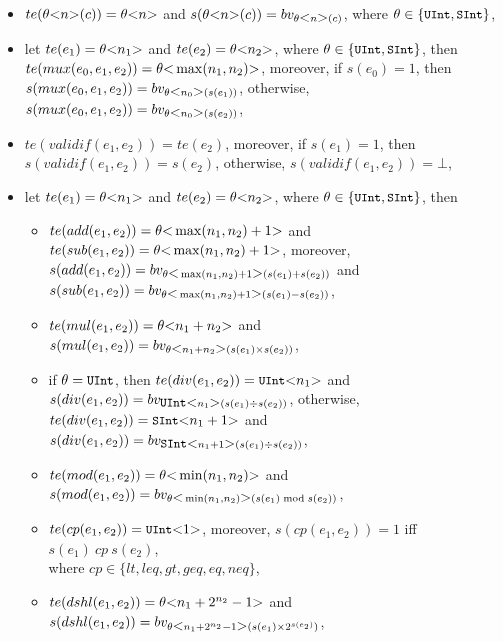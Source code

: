\begin{itemize}
\item $te(\theta \mbox{<} n \mbox{>}(c)) = \theta \mbox{<} n \mbox{>}$ and $s(\theta \mbox{<} n \mbox{>}(c)) = bv_{\theta \mbox{<} n \mbox{>}(c)}$, where $\theta \in \{\mbox{\prettyll{UInt}}, \mbox{\prettyll{SInt}}\}$,
%
\item let $te(e_1) = \theta \mbox{<} n_1 \mbox{>}$ and $te(e_2) = \theta \mbox{<} n_2 \mbox{>}$, where $\theta \in \{\mbox{\prettyll{UInt}}, \mbox{\prettyll{SInt}}\}$, then $te(mux(e_0, e_1, e_2)) = \theta\mbox{<} \max(n_1, n_2) \mbox{>}$, moreover, if $s(e_0) = 1$, then $s(mux(e_0, e_1, e_2)) = bv_{\theta\mbox{<} n_0 \mbox{>}(s(e_1))}$, otherwise, $s(mux(e_0, e_1, e_2)) = bv_{\theta\mbox{<} n_0 \mbox{>}(s(e_2))}$,
%
\item $te(validif(e_1, e_2)) = te(e_2)$, moreover, if $s(e_1) = 1$, then $s(validif(e_1, e_2)) = s(e_2)$, otherwise, $s(validif(e_1, e_2))  = \bot$,
%
\item let $te(e_1) = \theta \mbox{<} n_1 \mbox{>}$ and $te(e_2) = \theta \mbox{<} n_2 \mbox{>}$, where $\theta \in \{\mbox{\prettyll{UInt}}, \mbox{\prettyll{SInt}}\}$, then
\begin{itemize}
\item $te(add(e_1, e_2)) =\theta \mbox{<} \max(n_1, n_2)+1 \mbox{>}$ and $te(sub(e_1, e_2)) = \theta \mbox{<} \max(n_1, n_2)+1 \mbox{>}$, moreover, $s(add(e_1, e_2)) = bv_{\theta \mbox{<} \max(n_1,n_2)+1 \mbox{>} (s(e_1) + s(e_2))}$ and \\
$s(sub(e_1, e_2)) = bv_{\theta \mbox{<} \max(n_1,n_2)+1 \mbox{>} (s(e_1) - s(e_2))}$,
%
\item $te(mul(e_1, e_2)) = \theta \mbox{<} n_1+n_2 \mbox{>}$ and $s(mul(e_1, e_2)) = bv_{\theta \mbox{<} n_1+n_2 \mbox{>} (s(e_1) \times s(e_2))}$,
%
\item  if $\theta = \mbox{\prettyll{UInt}}$, then $te(div(e_1, e_2)) =\mbox{\prettyll{UInt}} \bwidth{n_1}$ and $s(div(e_1, e_2)) = bv_{\mbox{\prettyll{UInt}} \bwidth{n_1} (s(e_1) \div s(e_2))}$, otherwise, $te(div(e_1, e_2)) = \mbox{\prettyll{SInt}} \bwidth{n_1+1}$ and $s(div(e_1, e_2)) = bv_{\mbox{\prettyll{SInt}} \bwidth{n_1+1} (s(e_1) \div s(e_2))}$,
%
\item $te(mod(e_1, e_2)) = \theta \mbox{<} \min(n_1,n_2) \mbox{>}$ and $s(mod(e_1, e_2)) = bv_{\theta \mbox{<} \min(n_1,n_2) \mbox{>} (s(e_1) \bmod s(e_2))}$,
%
\item $te(cp(e_1, e_2)) = \mbox{\prettyll{UInt}} \bwidth{1}$, moreover, $s(cp(e_1, e_2)) = 1$ iff $s(e_1)\ cp\ s(e_2)$, \\ where $cp \in \{lt, leq, gt, geq, eq, neq\}$,
%
\item $te(dshl(e_1, e_2)) = \theta \mbox{<} n_1+2^{n_2}-1 \mbox{>}$ and $s(dshl(e_1, e_2)) = bv_{\theta \mbox{<} n_1+2^{n_2}-1 \mbox{>}(s(e_1) \times 2^{s(e_2)})}$,

\end{itemize}
\end{itemize}
